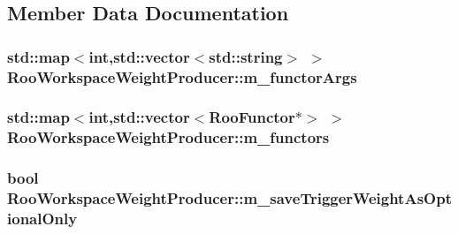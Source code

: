 \subsection{Member Data Documentation}
\hypertarget{classRooWorkspaceWeightProducer_ac8bb8f7313dc398dd0ff966ee21ca2de}{
\subsubsection[{m\_\-functorArgs}]{\setlength{\rightskip}{0pt plus 5cm}std::map$<$int,std::vector$<$std::string$>$ $>$ {\bf RooWorkspaceWeightProducer::m\_\-functorArgs}}}
\label{classRooWorkspaceWeightProducer_ac8bb8f7313dc398dd0ff966ee21ca2de}
\hypertarget{classRooWorkspaceWeightProducer_a1b8f4af2c116a1b0e0eb25fbe46598e4}{
\subsubsection[{m\_\-functors}]{\setlength{\rightskip}{0pt plus 5cm}std::map$<$int,std::vector$<$RooFunctor$\ast$$>$ $>$ {\bf RooWorkspaceWeightProducer::m\_\-functors}}}
\label{classRooWorkspaceWeightProducer_a1b8f4af2c116a1b0e0eb25fbe46598e4}
\hypertarget{classRooWorkspaceWeightProducer_a3b734d1238bd91580f7f86ba5e11f4ff}{
\subsubsection[{m\_\-saveTriggerWeightAsOptionalOnly}]{\setlength{\rightskip}{0pt plus 5cm}bool {\bf RooWorkspaceWeightProducer::m\_\-saveTriggerWeightAsOptionalOnly}}}
\label{classRooWorkspaceWeightProducer_a3b734d1238bd91580f7f86ba5e11f4ff}
